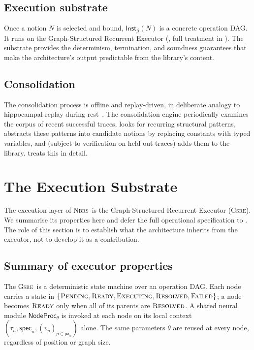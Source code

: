 \documentclass[11pt,a4paper]{article}
\theoremstyle{plain}
\theoremstyle{definition}
\theoremstyle{remark}
\newcommand{\Spec}{\mathsf{spec}}
\newcommand{\Parents}{\mathsf{pa}}
\newcommand{\GSRE}{\textsc{Gsre}}
\newcommand{\NBRS}{\textsc{Nbrs}}
\newcommand{\NodeProc}{\mathsf{NodeProc}}
\newcommand{\Inst}{\mathsf{Inst}}
\newcommand{\PENDING}{\textsc{Pending}}
\newcommand{\READY}{\textsc{Ready}}
\newcommand{\EXEC}{\textsc{Executing}}
\newcommand{\RESOLVED}{\textsc{Resolved}}
\newcommand{\FAILED}{\textsc{Failed}}
\begin{document}
\subsection{Execution substrate}

Once a notion $N$ is selected and bound, $\Inst_\beta(N)$ is a concrete operation DAG. It runs on the Graph-Structured Recurrent Executor (, full treatment in ). The substrate provides the determinism, termination, and soundness guarantees that make the architecture's output predictable from the library's content.

\subsection{Consolidation}

The consolidation process is offline and replay-driven, in deliberate analogy to hippocampal replay during rest~\cite{spens2024consolidation, kumaran2016complementary}. The consolidation engine periodically examines the corpus of recent successful traces, looks for recurring structural patterns, abstracts these patterns into candidate notions by replacing constants with typed variables, and (subject to verification on held-out traces) adds them to the library.  treats this in detail.

\section{The Execution Substrate}
\label{sec:substrate}

The execution layer of \NBRS\ is the Graph-Structured Recurrent Executor (\GSRE). We summarise its properties here and defer the full operational specification to . The role of this section is to establish what the architecture inherits from the executor, not to develop it as a contribution.

\subsection{Summary of executor properties}

The \GSRE\ is a deterministic state machine over an operation DAG. Each node carries a state in $\{\PENDING, \READY, \EXEC, \RESOLVED, \FAILED\}$; a node becomes $\READY$ only when all of its parents are $\RESOLVED$. A shared neural module $\NodeProc_\theta$ is invoked at each node on its local context $(\tau_n, \Spec_n, (v_p)_{p \in \Parents_n})$ alone. The same parameters $\theta$ are reused at every node, regardless of position or graph size.
\end{document}
